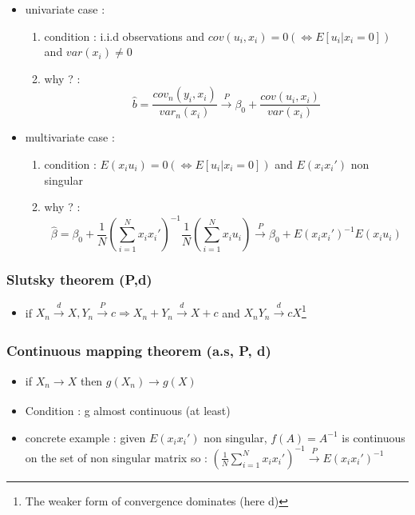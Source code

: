 \documentclass{article}
\begin{document}
\begin{consbox}
    \begin{itemize}
        \item univariate case : 
        \begin{enumerate}
            \item condition : i.i.d observations and $cov(u_i,x_i) =0 (\Longleftrightarrow E[u_i|x_i=0])$ and $var(x_i)\neq0$
            \item why ? : 
\begin{equation}
    \hat{b} = \frac{cov_n(y_i,x_i)}{var_n(x_i)} \xrightarrow[]{P} \beta_0 + \frac{cov(u_i,x_i)}{var(x_i)}
\end{equation}
        \end{enumerate}
        \item multivariate case : 
        \begin{enumerate}
            \item condition : $E(x_iu_i)=0(\Longleftrightarrow E[u_i|x_i=0])$ and $E(x_ix_i')$ non singular
            \item why ? : 
\begin{equation}
    \hat{\beta} = \beta_0 + \frac{1}{N}(\sum_{i=1}^Nx_ix_i')^{-1}\frac{1}{N}(\sum_{i=1}^Nx_iu_i) \xrightarrow[]{P} \beta_0 + E(x_ix_i')^{-1}E(x_iu_i)
\end{equation}
        \end{enumerate}
    \end{itemize}
\end{consbox}


\subsubsection{Slutsky theorem (P,d)}
\begin{itemize}
    \item if $X_n\xrightarrow[]{d}X, Y_n\xrightarrow[]{P}c \Longrightarrow X_n+Y_n \xrightarrow[]{d}X+c$ and $X_nY_n\xrightarrow[]{d} cX$\footnote{The weaker form of convergence dominates (here d)}
\end{itemize}
\subsubsection{Continuous mapping theorem (a.s, P, d)}
\begin{itemize}
    \item if $X_n\xrightarrow{}X$ then $g(X_n)\xrightarrow[]{}g(X)$
    \item Condition : g almost continuous (at least)
    \item concrete example : given $E(x_ix_i')$ non singular, $f(A) = A^{-1}$ is continuous on the set of non singular matrix so : $(\frac{1}{N}\sum_{i=1}^Nx_ix_i')^{-1} \xrightarrow[]{P}E(x_ix_i')^{-1}$
\end{itemize}
\end{document}

